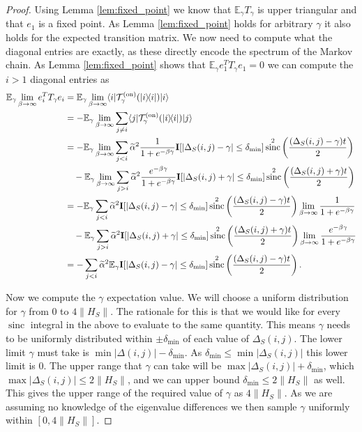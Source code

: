 \documentclass{article}
\newcommand{\on}{\rm on}
\newcommand{\ket}[1]{|#1\rangle}
\newcommand{\bra}[1]{\langle #1|}
\newcommand{\ketbra}[2]{| #1\rangle\! \langle #2|}
\newcommand{\norm}[1]{\| #1 \|}
\newcommand{\EE}{\mathbb{E}}
\newcommand{\TT}{\mathcal{T}}
\DeclareMathOperator{\sinc}{sinc}
\begin{document}
\begin{proof}
Using Lemma \ref{lem:fixed_point} we know that $\EE_\gamma T_\gamma$ is upper triangular and that $e_1$ is a fixed point. As Lemma \ref{lem:fixed_point} holds for arbitrary $\gamma$ it also holds for the expected transition matrix. We now need to compute what the diagonal entries are exactly, as these directly encode the spectrum of the Markov chain. As Lemma \ref{lem:fixed_point} shows that $\EE_\gamma e_1^T T_\gamma e_1 = 0$ we can compute the $i > 1$ diagonal entries as
\begin{align}
    \EE_\gamma \lim_{\beta \to \infty} e_i^T T_\gamma e_i &= \EE_\gamma \lim_{\beta \to \infty} \bra{i} \TT_\gamma^{(\on)}(\ketbra{i}{i}) \ket{i} \\
    &= - \EE_\gamma \lim_{\beta \to \infty} \sum_{j \neq i} \bra{j} \TT_\gamma^{(\on)}(\ketbra{i}{i}) \ket{j} \\
    &= - \EE_\gamma \lim_{\beta \to \infty} \sum_{j < i} \widetilde{\alpha}^2 \frac{1}{1 + e^{-\beta \gamma}} \mathbf{I}[|\Delta_S(i,j) - \gamma| \le \delta_{\min}] \sinc^2 \left( \frac{(\Delta_S(i, j) - \gamma) t}{2} \right) \nonumber \\
    &\quad - \EE_\gamma \lim_{\beta \to \infty} \sum_{j > i} \widetilde{\alpha}^2 \frac{e^{-\beta \gamma}}{1 + e^{-\beta \gamma}} \mathbf{I}[|\Delta_S(i, j) + \gamma| \le \delta_{\min}] \sinc^2 \left( \frac{(\Delta_S(i, j) + \gamma) t}{2} \right) \\
    &= - \EE_\gamma  \sum_{j < i} \widetilde{\alpha}^2  \mathbf{I}[|\Delta_S(i,j) - \gamma| \le \delta_{\min}] \sinc^2 \left( \frac{(\Delta_S(i, j) - \gamma) t}{2} \right) \lim_{\beta \to \infty} \frac{1}{1 + e^{-\beta \gamma}} \nonumber \\
    &\quad - \EE_\gamma \sum_{j > i} \widetilde{\alpha}^2 \mathbf{I}[|\Delta_S(i, j) + \gamma| \le \delta_{\min}] \sinc^2 \left( \frac{(\Delta_S(i, j) + \gamma) t}{2} \right) \lim_{\beta \to \infty} \frac{e^{-\beta \gamma}}{1 + e^{-\beta \gamma}} \\
    &= -   \sum_{j < i} \widetilde{\alpha}^2 \EE_\gamma \mathbf{I}[|\Delta_S(i,j) - \gamma| \le \delta_{\min}] \sinc^2 \left( \frac{(\Delta_S(i, j) - \gamma) t}{2} \right). \label{eq:ground_state_tmp_1}
\end{align}

Now we compute the $\gamma$ expectation value. We will choose a uniform distribution for $\gamma$ from 0 to $4 \norm{H_S}$. The rationale for this is that we would like for every $\sinc$ integral in the above to evaluate to the same quantity. This means $\gamma$ needs to be uniformly distributed within $\pm \delta_{\min}$ of each value of $\Delta_S(i,j)$. The lower limit $\gamma$ must take is $\min |\Delta(i,j)| - \delta_{\min}$. As $\delta_{\min} \le \min |\Delta_S(i,j)|$ this lower limit is 0. The upper range that $\gamma$ can take will be $\max |\Delta_S(i,j)| + \delta_{\min}$, which $\max |\Delta_S(i,j)| \le 2 \norm{H_S}$, and we can upper bound $\delta_{\min} \le 2 \norm{H_S}$ as well. This gives the upper range of the required value of $\gamma$ as $4 \norm{H_S}$. As we are assuming no knowledge of the eigenvalue differences we then sample $\gamma$ uniformly within $[0, 4 \norm{H_S}]$.



\end{proof}
\end{document}
